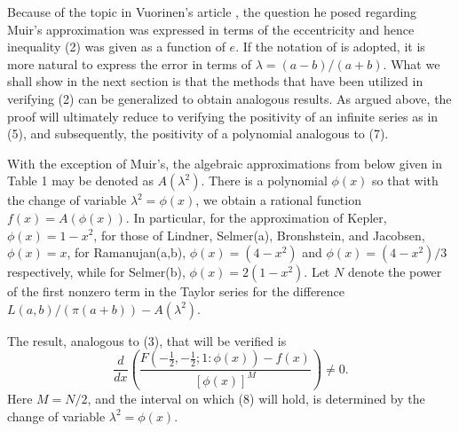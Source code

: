 \documentclass[12pt]{article}
\begin{document}
Because of the topic in Vuorinen's article \cite{MV}, the question  he 
posed regarding Muir's
approximation was  expressed in terms of the eccentricity and hence 
inequality (2) was given as a
function of $e$. If the notation of \cite{AB} is adopted, it is  more 
natural  to express the error in
terms of $\lambda= (a-b)/(a+b)$.   What we shall show in the next section 
is that the methods that
have been utilized in verifying (2) can be generalized to obtain 
analogous results. As argued above,
the proof will ultimately reduce to verifying the positivity of an 
infinite series as in (5), and
subsequently,  the positivity of a polynomial analogous to (7).  


\vspace{18pt} 
\vspace{12pt} 


With the exception of Muir's,   the algebraic
approximations from below given in Table 1 may be denoted as 
$A(\lambda^2)$.  There is  a polynomial
$\phi(x)$ so that with the change of variable $\lambda^2=\phi(x)$, we 
obtain a rational function 
$f(x)=A( \phi(x))$. In particular,  for  the approximation  of Kepler,
$\phi(x)=1-x^2$, for those of Lindner, Selmer(a), Bronshstein, and 
Jacobsen, $\phi(x)=x$,  for
Ramanujan(a,b), 
$\phi(x)=(4-x^2)$  and  $\phi(x)=(4-x^2)/3$ respectively,  while for 
Selmer(b), $\phi(x)=2(1-x^2)$. Let
$N$ denote the power of the first nonzero term in the Taylor series for 
the difference
$L(a,b)/( \pi (a+b) ) - A(\lambda^2)$.

The result,  analogous to (3), that will be verified  is   
\begin{equation}
\frac{d}{dx} \left(\frac{F(-\frac{1}{2}, -\frac{1}{2}; 
1:\phi(x))-f(x)}{[\phi(x)]^M}\right) \neq 0.
\end{equation}
Here  $M=N/2$,
and the interval on which   (8)  will hold,  is determined by  the change 
of variable 
$\lambda^2=\phi(x)$. 
\end{document}
